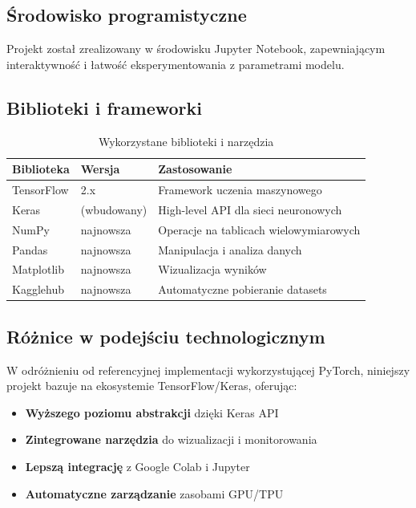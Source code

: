 \documentclass[12pt,a4paper]{article}
\begin{document}
\subsection{Środowisko programistyczne}

Projekt został zrealizowany w środowisku Jupyter Notebook, zapewniającym interaktywność i łatwość eksperymentowania z parametrami modelu.

\subsection{Biblioteki i frameworki}

\begin{table}[H]
\centering
\begin{tabular}{@{}lll@{}}
\toprule
\textbf{Biblioteka} & \textbf{Wersja} & \textbf{Zastosowanie} \\
\midrule
TensorFlow & 2.x & Framework uczenia maszynowego \\
Keras & (wbudowany) & High-level API dla sieci neuronowych \\
NumPy & najnowsza & Operacje na tablicach wielowymiarowych \\
Pandas & najnowsza & Manipulacja i analiza danych \\
Matplotlib & najnowsza & Wizualizacja wyników \\
Kagglehub & najnowsza & Automatyczne pobieranie datasets \\
\bottomrule
\end{tabular}
\caption{Wykorzystane biblioteki i narzędzia}
\end{table}

\subsection{Różnice w podejściu technologicznym}

W odróżnieniu od referencyjnej implementacji wykorzystującej PyTorch, niniejszy projekt bazuje na ekosystemie TensorFlow/Keras, oferując:

\begin{itemize}
    \item \textbf{Wyższego poziomu abstrakcji} dzięki Keras API
    \item \textbf{Zintegrowane narzędzia} do wizualizacji i monitorowania
    \item \textbf{Lepszą integrację} z Google Colab i Jupyter
    \item \textbf{Automatyczne zarządzanie} zasobami GPU/TPU
\end{itemize}
\end{document}
